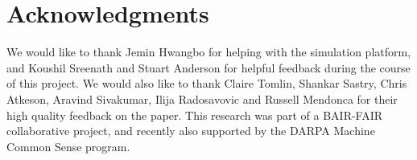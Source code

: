 \documentclass[conference]{IEEEtran}
\newcommand{\beginsupplement}{%
        \setcounter{table}{1}
        \renewcommand{\thetable}{S\arabic{table}}%
        \setcounter{figure}{1}
        \renewcommand{\thefigure}{S\arabic{figure}}%
        \setcounter{section}{1}
        \renewcommand{\thesection}{S\arabic{figure}}%
     }
\begin{document}



\section*{Acknowledgments}
We would like to thank Jemin Hwangbo for helping with the simulation platform, and Koushil Sreenath and Stuart Anderson for helpful feedback during the course of this project. We would also like to thank Claire Tomlin, Shankar Sastry, Chris Atkeson, Aravind Sivakumar, Ilija Radosavovic and Russell Mendonca for their high quality feedback on the paper. This research was part of a BAIR-FAIR collaborative project, and recently also supported by the DARPA Machine Common Sense program.




\beginsupplement

\pagebreak
{}

\end{document}
